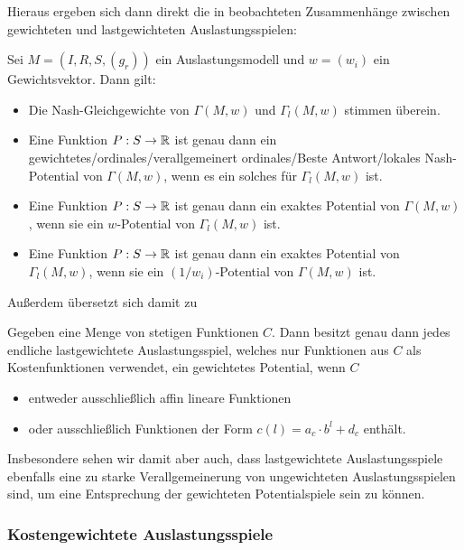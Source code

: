 Hieraus ergeben sich dann direkt die in \cite{CharExGewPotinWCG} beobachteten Zusammenhänge zwischen gewichteten und lastgewichteten Auslastungsspielen:

\begin{kor}
	Sei $M = (I, R, S, (g_r))$ ein Auslastungsmodell und $w = (w_i)$ ein Gewichtsvektor. Dann gilt:
	\begin{itemize}
		\item Die Nash-Gleichgewichte von $\Gamma(M, w)$ und $\Gamma_l(M,w)$ stimmen überein.
		\item Eine Funktion $P: S \to \mathbb{R}$ ist genau dann ein gewichtetes/ordinales/verallgemeinert ordinales/Beste Antwort/lokales Nash-Potential von $\Gamma(M, w)$, wenn es ein solches für $\Gamma_l(M,w)$ ist.
		\item Eine Funktion $P: S \to \mathbb{R}$ ist genau dann ein exaktes Potential von $\Gamma(M, w)$, wenn sie ein $w$-Potential von $\Gamma_l(M,w)$ ist.
		\item Eine Funktion $P: S \to \mathbb{R}$ ist genau dann ein exaktes Potential von $\Gamma_l(M, w)$, wenn sie ein $(1/w_i)$-Potential von $\Gamma(M,w)$ ist.		
	\end{itemize}
\end{kor}

Außerdem übersetzt sich damit  zu 
\begin{kor}\label{kor:CharExGewPotinLWCG}
	Gegeben eine Menge von stetigen Funktionen $C$. Dann besitzt genau dann jedes endliche lastgewichtete Auslastungsspiel, welches nur Funktionen aus $C$ als Kostenfunktionen verwendet, ein gewichtetes Potential, wenn $C$
	\begin{itemize}
		\item entweder ausschließlich affin lineare Funktionen
		\item oder ausschließlich Funktionen der Form $c(l) = a_c\cdot b^l + d_c$ enthält.
	\end{itemize}
\end{kor}

Insbesondere sehen wir damit aber auch, dass lastgewichtete Auslastungsspiele ebenfalls eine zu starke Verallgemeinerung von ungewichteten Auslastungsspielen sind, um eine Entsprechung der gewichteten Potentialspiele sein zu können.


\subsubsection{Kostengewichtete Auslastungsspiele}

